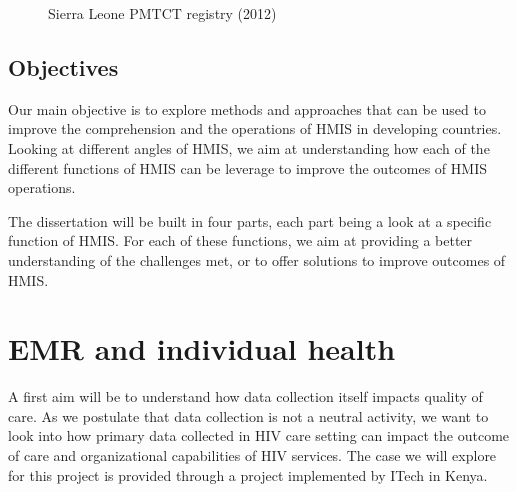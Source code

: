 \documentclass[a4paper,11pt,final,twoside]{article}
\begin{document}
\begin{figure}[ht]
\begin{center}
\caption{Sierra Leone PMTCT registry (2012)}
\end{center}
\end{figure}

    \subsection{Objectives}

Our main objective is to explore methods and approaches that can be used to improve the comprehension and the operations of HMIS in developing countries. Looking at different angles of HMIS, we aim at understanding how each of the different functions of HMIS can be leverage to improve the outcomes of HMIS operations.

The dissertation will be built in four parts, each part being a look at a specific function of HMIS. For each of these functions, we aim at providing a better understanding of the challenges met, or to offer solutions to improve outcomes of HMIS.


\section{EMR and individual health}

A first aim will be to understand how data collection itself impacts quality of care. As we postulate that data collection is not a neutral activity, we want to look into how primary data collected in HIV care setting can impact the outcome of care and organizational capabilities of HIV services. The case we will explore for this project is provided through a project implemented by ITech in Kenya.
\end{document}
